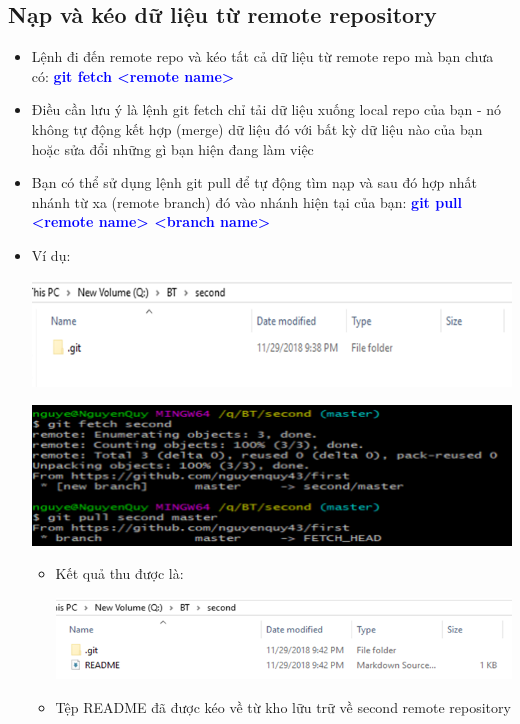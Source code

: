 \documentclass[12pt,a4paper]{report}
\begin{document}
\subsection{Nạp và kéo dữ liệu từ remote repository} 
\begin{itemize}
\item Lệnh đi đến remote repo và kéo tất cả dữ liệu từ remote repo mà bạn chưa có: \textcolor{blue}{\bf git fetch <remote name>}
\item Điều cần lưu ý là lệnh git fetch chỉ tải dữ liệu xuống  local repo của bạn - nó không tự động kết hợp (merge) dữ liệu đó với bất kỳ dữ liệu nào của bạn hoặc sửa đổi những gì bạn hiện đang làm việc
\item Bạn có thể sử dụng lệnh git pull để tự động tìm nạp và sau đó hợp nhất nhánh từ xa (remote branch) đó vào nhánh hiện tại của bạn: \textcolor{blue}{\bf git pull <remote name> <branch name>}
\item Ví dụ: 
	
	\includegraphics[width=0.8\linewidth]{screenshot035}

	\label{fig:screenshot035}

	\includegraphics[width=0.8\linewidth]{screenshot036}

	\label{fig:screenshot036}

\begin{itemize}
\item Kết quả thu được là: 

	\includegraphics[width=0.8\linewidth]{screenshot037}

	\label{fig:screenshot037}

\item Tệp README đã được kéo về từ kho lữu trữ về second remote repository
\end{itemize}
\end{itemize}
\end{document}
